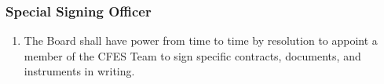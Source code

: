 \subsubsection{Special Signing Officer}
\label{special-signing-officer}

\begin{enumerate}
 \item The Board shall have power from time to time by resolution to appoint a member of the CFES Team to sign specific contracts, documents, and instruments in writing.
\end{enumerate}
